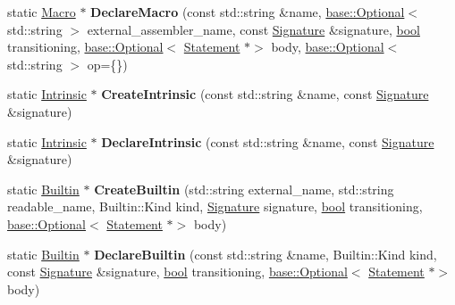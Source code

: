 \begin{DoxyCompactItemize}
static \mbox{\hyperlink{classv8_1_1internal_1_1torque_1_1Macro}{Macro}} $\ast$ {\bfseries Declare\+Macro} (const std\+::string \&name, \mbox{\hyperlink{classv8_1_1base_1_1Optional}{base\+::\+Optional}}$<$ std\+::string $>$ external\+\_\+assembler\+\_\+name, const \mbox{\hyperlink{structv8_1_1internal_1_1torque_1_1Signature}{Signature}} \&signature, \mbox{\hyperlink{classbool}{bool}} transitioning, \mbox{\hyperlink{classv8_1_1base_1_1Optional}{base\+::\+Optional}}$<$ \mbox{\hyperlink{structv8_1_1internal_1_1torque_1_1Statement}{Statement}} $\ast$$>$ body, \mbox{\hyperlink{classv8_1_1base_1_1Optional}{base\+::\+Optional}}$<$ std\+::string $>$ op=\{\})
\item 
\mbox{\label{classv8_1_1internal_1_1torque_1_1Declarations_a0d267b55426856a83da6f86c3a65eeb7}} 
static \mbox{\hyperlink{classv8_1_1internal_1_1torque_1_1Intrinsic}{Intrinsic}} $\ast$ {\bfseries Create\+Intrinsic} (const std\+::string \&name, const \mbox{\hyperlink{structv8_1_1internal_1_1torque_1_1Signature}{Signature}} \&signature)
\item 
\mbox{\label{classv8_1_1internal_1_1torque_1_1Declarations_a94f16f89c1d47716eebcd1cba89f8103}} 
static \mbox{\hyperlink{classv8_1_1internal_1_1torque_1_1Intrinsic}{Intrinsic}} $\ast$ {\bfseries Declare\+Intrinsic} (const std\+::string \&name, const \mbox{\hyperlink{structv8_1_1internal_1_1torque_1_1Signature}{Signature}} \&signature)
\item 
\mbox{\label{classv8_1_1internal_1_1torque_1_1Declarations_a998276216ca6429f079a7ce1f18c39e8}} 
static \mbox{\hyperlink{classv8_1_1internal_1_1torque_1_1Builtin}{Builtin}} $\ast$ {\bfseries Create\+Builtin} (std\+::string external\+\_\+name, std\+::string readable\+\_\+name, Builtin\+::\+Kind kind, \mbox{\hyperlink{structv8_1_1internal_1_1torque_1_1Signature}{Signature}} signature, \mbox{\hyperlink{classbool}{bool}} transitioning, \mbox{\hyperlink{classv8_1_1base_1_1Optional}{base\+::\+Optional}}$<$ \mbox{\hyperlink{structv8_1_1internal_1_1torque_1_1Statement}{Statement}} $\ast$$>$ body)
\item 
\mbox{\label{classv8_1_1internal_1_1torque_1_1Declarations_a8f693ab1528fa9befe49bed4863f5d36}} 
static \mbox{\hyperlink{classv8_1_1internal_1_1torque_1_1Builtin}{Builtin}} $\ast$ {\bfseries Declare\+Builtin} (const std\+::string \&name, Builtin\+::\+Kind kind, const \mbox{\hyperlink{structv8_1_1internal_1_1torque_1_1Signature}{Signature}} \&signature, \mbox{\hyperlink{classbool}{bool}} transitioning, \mbox{\hyperlink{classv8_1_1base_1_1Optional}{base\+::\+Optional}}$<$ \mbox{\hyperlink{structv8_1_1internal_1_1torque_1_1Statement}{Statement}} $\ast$$>$ body)
$$
\end{DoxyCompactItemize}
